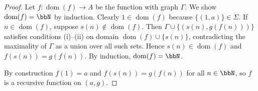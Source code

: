 \begin{proof}
Let $f: \operatorname{dom}(f) \to A$ be the function with graph $\Gamma$. We show $\operatorname{dom}(f) = \bbN$ by induction. Clearly $1 \in \operatorname{dom}(f)$ because $\{(1, a)\} \in \Sigma$. If $n \in \operatorname{dom}(f)$, suppose $s(n) \notin \operatorname{dom}(f)$. Then $\Gamma \cup \{(s(n), g(f(n)))\}$ satisfies conditions (i)--(ii) on domain $\operatorname{dom}(f) \cup \{s(n)\}$, contradicting the maximality of $\Gamma$ as a union over all such sets. Hence $s(n) \in \operatorname{dom}(f)$ and $f(s(n)) = g(f(n))$. By induction, $\operatorname{dom}(f) = \bbN$.

By construction $f(1) = a$ and $f(s(n)) = g(f(n))$ for all $n \in \bbN$, so $f$ is a recursive function on $(a, g)$.
\end{proof}